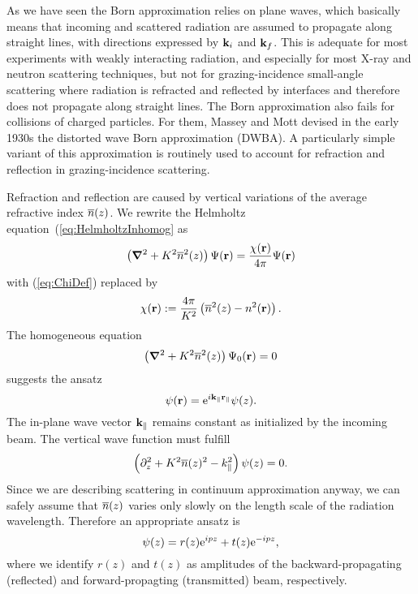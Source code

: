 As we have seen
the Born approximation relies on plane waves,
which basically means that incoming and scattered radiation
are assumed to propagate along straight lines,
with directions expressed by $\mathbf{k}_i$ and $\mathbf{k}_f$.
This is adequate for most experiments with weakly interacting radiation,
and especially for most X-ray and neutron scattering techniques,
but not for grazing-incidence small-angle scattering
where radiation is refracted and reflected by interfaces
and therefore does not propagate along straight lines.
The Born approximation also fails for collisions of charged particles.
For them, Massey and Mott devised in the early 1930s
the distorted wave Born approximation (DWBA).
A particularly simple variant of this approximation
is routinely used to account for refraction and reflection
in grazing-incidence scattering.

Refraction and reflection are caused by vertical variations
of the average refractive index $\overline{n}(z)$.
We rewrite the Helmholtz equation~(\ref{eq:HelmholtzInhomog} as
\begin{equation}\label{eq:HelmholtzGraded}
  \left(\bm{\nabla}^2+K^2\overline{n}^2(z)\right)\Psi(\mathbf{r})
  = \frac{\chi(\mathbf{r})}{4\pi}\Psi(\mathbf{r})
\end{equation}
with (\ref{eq:ChiDef}) replaced by
\begin{equation}\label{eq:ChiGraded}
  \chi(\mathbf{r}) := \frac{4\pi}{K^2}\left(\overline{n}^2(z)-n^2(\mathbf{r})\right).
\end{equation}
The homogeneous equation
\begin{equation}\label{eq:HelmholtzGradedHomog}
  \left(\bm{\nabla}^2+K^2\overline{n}^2(z)\right)\Psi_0(\mathbf{r}) = 0
\end{equation}
suggests the ansatz
\begin{equation}\label{eq:wave3}
\psi(\mathbf{r}) = {\rm e}^{i \mathbf{k}_\parallel\mathbf{r}_\parallel} \psi(z).
\end{equation}
The in-plane wave vector $\mathbf{k}_\parallel$ remains constant
as initialized by the incoming beam.
The vertical wave function must fulfill
\begin{equation}\label{eq:wavez}
\left(\partial_z^2 + K^2\overline{n}(z)^2 - k_\parallel^2 \right) \psi(z) = 0.
\end{equation}
Since we are describing scattering in continuum approximation anyway,
we can safely assume that $\overline{n}(z)$ varies only slowly on the length scale
of the radiation wavelength.
Therefore an appropriate ansatz is
\begin{equation}
  \psi(z) = r(z){\rm e}^{ipz} + t(z){\rm e}^{-ipz},
\end{equation}
where we identify $r(z)$ and $t(z)$
as amplitudes of the backward-propagating (reflected)
and forward-propagting (transmitted) beam, respectively.

